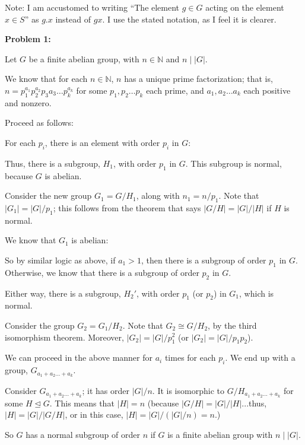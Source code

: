 \documentclass[a4paper,12pt]{article}
\newcommand{\tab}{\hspace{4mm}} %
\newcommand{\absval}[1]{\lvert #1 \rvert}
\newcommand{\N}{\mathbb{N}}
\newcommand{\subgp}{\mathrel{\unlhd}}
\begin{document}
Note: I am accustomed to writing ``The element $g \in G$ acting on the element $x \in S$'' as $g.x$ instead of $gx$. I use the stated notation, as I feel it is clearer.

{\bf Problem 1:}

Let $G$ be a finite abelian group, with $n \in \N$ and $n \mid \absval{G}$.

We know that for each $n \in \N$, $n$ has a unique prime factorization; that is, $n=p_1^{a_1}p_2^{a_2}p_3{a_3}\ldots p_k^{a_k}$ for some $p_1, p_2 \ldots p_k$ each prime, and $a_1, a_2 \ldots a_k$ each positive and nonzero.

Proceed as follows:

\tab For each $p_i$, there is an element with order $p_i$ in $G$:

\tab \tab %

\tab Thus, there is a subgroup, $H_1$, with order $p_1$ in $G$. This subgroup is normal, because $G$ is abelian. 

\tab Consider the new group $G_1=G/H_1$, along with $n_1 = n/p_1$. Note that $\absval{G_1} = \absval{G}/p_1$; this follows from the theorem that says $\absval{G/H} = \absval{G}/\absval{H}$ if $H$ is normal.

\tab We know that $G_1$ is abelian:

\tab \tab %

\tab So by similar logic as above, if $a_1 > 1$, then there is a subgroup of order $p_1$ in $G$. Otherwise, we know that there is a subgroup of order $p_2$ in $G$.

\tab Either way, there is a subgroup, $H_2'$, with order $p_1$ (or $p_2$) in $G_1$, which is normal. %

\tab Consider the group $G_2=G_1/H_2$. Note that $G_2 \cong G/H_2$, by the third isomorphism theorem. Moreover, $\absval{G_2} = \absval{G}/p_1^2$ (or $\absval{G_2} = \absval{G}/p_1p_2$).

\tab We can proceed in the above manner for $a_i$ times for each $p_i$. We end up with a group, $G_{a_1+a_2 \ldots + a_k}$.

Consider $G_{a_1+a_2 \ldots +a_k}$; it has order $\absval{G}/n$. It is isomorphic to $G/H_{a_1+a_2 \ldots +a_k}$ for some $H \subgp G$. This means that $\absval{H} = n$ (because $\absval{G/H} = \absval{G}/\absval{H}$...thus, $\absval{H} = \absval{G}/\absval{G/H}$, or in this case, $\absval{H} = \absval{G}/(\absval{G}/n) = n$.)

So $G$ has a normal subgroup of order $n$ if $G$ is a finite abelian group with $n \mid \absval{G}$.
\end{document}
